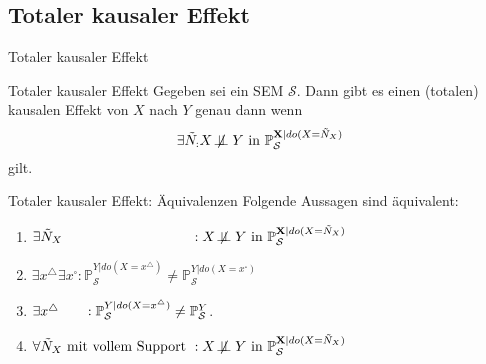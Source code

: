 \subsection{Totaler kausaler Effekt}
\begin{frame}{Totaler kausaler Effekt}
    \begin{block}{Totaler kausaler Effekt}
        Gegeben sei ein SEM $\mathcal{S}$. Dann gibt es einen
        (totalen) kausalen Effekt von $X$ nach $Y$ genau dann wenn
        \[\exists \tilde{N}_: X \not\!\perp\!\!\!\perp Y \text{ in } \mathbb{P}_\mathcal{S}^{\mathbf{X}|do(X=\tilde{N}_X)}\]
        gilt.
    \end{block}
\end{frame}

\begin{frame}[t]{Totaler kausaler Effekt: Äquivalenzen}
    Folgende Aussagen sind äquivalent:

    \begin{enumerate}[label=(\roman*)]
        \item $\exists \tilde{N}_X \hphantom{\text{ mit vollem Support }}: X \not\!\perp\!\!\!\perp Y \text{ in } \mathbb{P}_\mathcal{S}^{\mathbf{X}|do(X=\tilde{N}_X)}$
        \item $\exists x^\triangle \exists x^\square: \mathbb{P}_\mathcal{S}^{Y|do(X=x^\triangle)} \neq \mathbb{P}_\mathcal{S}^{Y|do(X=x^\square)}$
        \item $\exists x^\triangle \hphantom{\exists x^\square}: \mathbb{P}_\mathcal{S}^{Y|do(X=x^\triangle)} \neq \mathbb{P}_\mathcal{S}^Y$.
        \item $\forall \tilde{N}_X \text{ mit vollem Support }: X \not\!\perp\!\!\!\perp Y \text{ in } \mathbb{P}_\mathcal{S}^{\mathbf{X}|do(X=\tilde{N}_X)}$
    \end{enumerate}


\end{frame}

